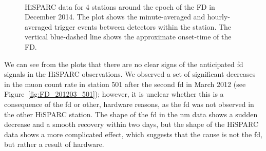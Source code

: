 \begin{figure}[ht]
	\centering
	 \\
	
	\qquad
	
	
	\caption{HiSPARC data for 4 stations around the epoch of the FD in December 2014. The plot shows the minute-averaged and hourly-averaged trigger events between detectors within the station. The vertical blue-dashed line shows the approximate onset-time of the FD.}
	\label{fig:FD_201412}
\end{figure}


We can see from the plots that there are no clear signs of the anticipated \gls{fd} signals in the HiSPARC observations. We observed a set of significant decreases in the muon count rate in station 501 after the second \gls{fd} in March 2012 (see Figure~\ref{fig:FD_201203_501}); however, it is unclear whether this is a consequence of the \gls{fd} or other, hardware reasons, as the \gls{fd} was not observed in the other HiSPARC station. The shape of the \gls{fd} in the \gls{nm} data shows a sudden decrease and a smooth recovery within two days, but the shape of the HiSPARC data shows a more complicated effect, which suggests that the cause is not the \gls{fd}, but rather a result of hardware.


